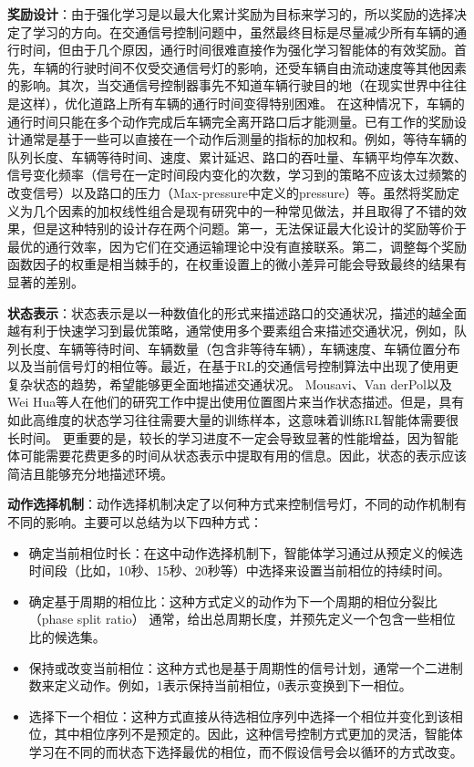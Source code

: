 \textbf{奖励设计}：由于强化学习是以最大化累计奖励为目标来学习的，所以奖励的选择决定了学习的方向。在交通信号控制问题中，虽然最终目标是尽量减少所有车辆的通行时间，但由于几个原因，通行时间很难直接作为强化学习智能体的有效奖励。首先，车辆的行驶时间不仅受交通信号灯的影响，还受车辆自由流动速度等其他因素的影响。其次，当交通信号控制器事先不知道车辆行驶目的地（在现实世界中往往是这样），优化道路上所有车辆的通行时间变得特别困难。 在这种情况下，车辆的通行时间只能在多个动作完成后车辆完全离开路口后才能测量。已有工作的奖励设计通常是基于一些可以直接在一个动作后测量的指标的加权和。例如，等待车辆的队列长度、车辆等待时间、速度、累计延迟、路口的吞吐量、车辆平均停车次数、信号变化频率（信号在一定时间段内变化的次数，学习到的策略不应该太过频繁的改变信号）以及路口的压力（Max-pressure中定义的pressure）等。虽然将奖励定义为几个因素的加权线性组合是现有研究中的一种常见做法，并且取得了不错的效果，但是这种特别的设计存在两个问题。第一，无法保证最大化设计的奖励等价于最优的通行效率，因为它们在交通运输理论中没有直接联系。第二，调整每个奖励函数因子的权重是相当棘手的，在权重设置上的微小差异可能会导致最终的结果有显著的差别。

\textbf{状态表示}：状态表示是以一种数值化的形式来描述路口的交通状况，描述的越全面越有利于快速学习到最优策略，通常使用多个要素组合来描述交通状况，例如，队列长度、车辆等待时间、车辆数量（包含非等待车辆），车辆速度、车辆位置分布以及当前信号灯的相位等。最近，在基于RL的交通信号控制算法中出现了使用更复杂状态的趋势，希望能够更全面地描述交通状况。 Mousavi、Van derPol以及Wei Hua等人在他们的研究工作中提出使用位置图片来当作状态描述。但是，具有如此高维度的状态学习往往需要大量的训练样本，这意味着训练RL智能体需要很长时间。 更重要的是，较长的学习进度不一定会导致显著的性能增益，因为智能体可能需要花费更多的时间从状态表示中提取有用的信息。因此，状态的表示应该简洁且能够充分地描述环境。

\textbf{动作选择机制}：动作选择机制决定了以何种方式来控制信号灯，不同的动作机制有不同的影响。主要可以总结为以下四种方式：
\begin{itemize}
    \item 确定当前相位时长：在这中动作选择机制下，智能体学习通过从预定义的候选时间段（比如，10秒、15秒、20秒等）中选择来设置当前相位的持续时间。
    \item 确定基于周期的相位比：这种方式定义的动作为下一个周期的相位分裂比（phase split ratio） 通常，给出总周期长度，并预先定义一个包含一些相位比的候选集。
    \item 保持或改变当前相位：这种方式也是基于周期性的信号计划，通常一个二进制数来定义动作。例如，1表示保持当前相位，0表示变换到下一相位。
    \item 选择下一个相位：这种方式直接从待选相位序列中选择一个相位并变化到该相位，其中相位序列不是预定的。因此，这种信号控制方式更加的灵活，智能体学习在不同的而状态下选择最优的相位，而不假设信号会以循环的方式改变。
\end{itemize}

